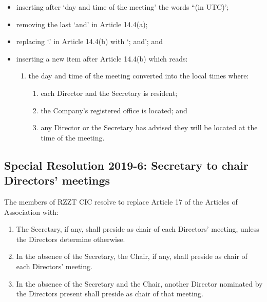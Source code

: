 \documentclass[a4paper,10pt]{article}
\begin{document}
\begin{itemize}
  \item inserting after `day and time of the meeting' the words ``(in UTC)';
  \item removing the last `and' in Article 14.4(a);
  \item replacing `.' in Article 14.4(b) with `; and'; and
  \item inserting a new item after Article 14.4(b) which reads:
  \begin{framed}
  \begin{enumerate}
    \renewcommand{\labelenumi}{(\alph{enumi})}
    \setcounter{enumi}{2}
    \item the day and time of the meeting converted into the local times where:
    \begin{enumerate}
      \renewcommand{\labelenumii}{(\roman{enumii})}
      \item each Director and the Secretary is resident;
      \item the Company's registered office is located; and
      \item any Director or the Secretary has advised they will be located at the time of the meeting.
    \end{enumerate}
  \end{enumerate}
  \end{framed}
\end{itemize}

\subsection{Special Resolution 2019-6: Secretary to chair Directors' meetings}

The members of RZZT CIC resolve to replace Article 17 of the Articles of Association with:

\begin{framed}
  \begin{enumerate}
    \renewcommand{\labelenumi}{17.\arabic{enumi}}
    \item The Secretary, if any, shall preside as chair of each Directors' meeting, unless the Directors determine otherwise.
    \item In the absence of the Secretary, the Chair, if any, shall preside as chair of each Directors' meeting.
    \item In the absence of the Secretary and the Chair, another Director nominated by the Directors present shall preside as chair of that meeting.
  \end{enumerate}
\end{framed}
\end{document}
